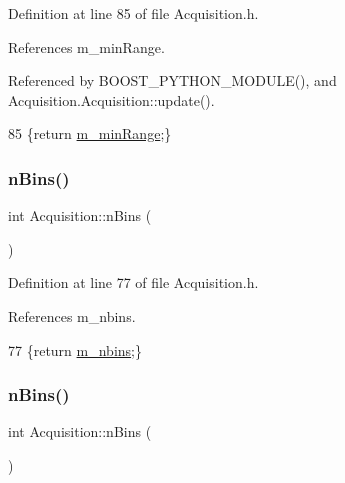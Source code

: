 Definition at line 85 of file Acquisition.\+h.



References m\+\_\+min\+Range.



Referenced by B\+O\+O\+S\+T\+\_\+\+P\+Y\+T\+H\+O\+N\+\_\+\+M\+O\+D\+U\+L\+E(), and Acquisition.\+Acquisition\+::update().


\begin{DoxyCode}
85 \{\textcolor{keywordflow}{return} \hyperlink{classAcquisition_a06b3ea027ebdcb15f64a6517ceb99b76}{m\_minRange};\}
\end{DoxyCode}
\mbox{\label{classAcquisition_a3a3dad0de9535d5a29c0810a5bdc3ae3}} 
\subsubsection{\texorpdfstring{n\+Bins()}{nBins()}\hspace{0.1cm}{\footnotesize\ttfamily [1/2]}}
{\footnotesize\ttfamily int Acquisition\+::n\+Bins (\begin{DoxyParamCaption}{ }\end{DoxyParamCaption})\hspace{0.3cm}{\ttfamily [inline]}}



Definition at line 77 of file Acquisition.\+h.



References m\+\_\+nbins.


\begin{DoxyCode}
77 \{\textcolor{keywordflow}{return} \hyperlink{classAcquisition_a05bccdc4b9ada37beaeba8794ccef12d}{m\_nbins};\}
\end{DoxyCode}
\mbox{\label{classAcquisition_a3a3dad0de9535d5a29c0810a5bdc3ae3}} 
\subsubsection{\texorpdfstring{n\+Bins()}{nBins()}\hspace{0.1cm}{\footnotesize\ttfamily [2/2]}}
{\footnotesize\ttfamily int Acquisition\+::n\+Bins (\begin{DoxyParamCaption}{ }\end{DoxyParamCaption})\hspace{0.3cm}{\ttfamily [inline]}}



